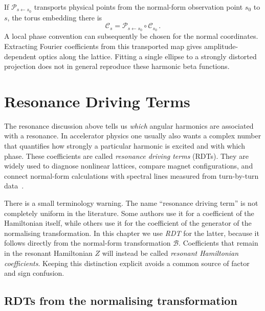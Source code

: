 If $\mathcal P_{s\leftarrow s_0}$ transports physical points from the
normal-form observation point $s_0$ to $s$, the torus embedding there is
\begin{equation}
    \mathcal C_s = \mathcal P_{s\leftarrow s_0}\circ\mathcal C_{s_0}\,.
\end{equation}
A local phase convention can subsequently be chosen for the normal
coordinates.  Extracting Fourier coefficients from this transported map
gives amplitude-dependent optics along the lattice.  Fitting a single
ellipse to a strongly distorted projection does not in general reproduce
these harmonic beta functions.



\section{Resonance Driving Terms}\label{sec:nnf-rdts}

The resonance discussion above tells us \emph{which} angular harmonics are
associated with a resonance.  In accelerator physics one usually also wants a
complex number that quantifies how strongly a particular harmonic is excited
and with which phase.  These coefficients are called \emph{resonance driving
terms} (RDTs).  They are widely used to diagnose nonlinear lattices, compare
magnet configurations, and connect normal-form calculations with spectral
lines measured from turn-by-turn data~\cite{PhysRevSTAB.17.074001}.

There is a small terminology warning.  The name ``resonance driving term'' is
not completely uniform in the literature.  Some authors use it for a
coefficient of the Hamiltonian itself, while others use it for the coefficient
of the generator of the normalising transformation.  In this chapter we use
\emph{RDT} for the latter, because it follows directly from the normal-form
transformation $\mathcal B$.  Coefficients that remain in the resonant
Hamiltonian $Z$ will instead be called \emph{resonant Hamiltonian
coefficients}.  Keeping this distinction explicit avoids a common source of
factor and sign confusion.


\subsection{RDTs from the normalising transformation}

